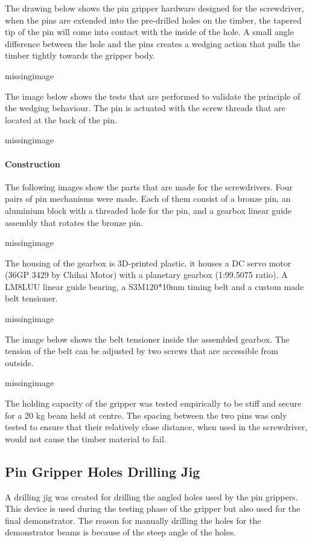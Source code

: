 The drawing below shows the pin gripper hardware designed for the screwdriver, when the pins are extended into the pre-drilled holes on the timber, the tapered tip of the pin will come into contact with the inside of the hole. A small angle difference between the hole and the pins creates a wedging action that pulls the timber tightly towards the gripper body.  

missingimage

The image below shows the tests that are performed to validate the principle of the wedging behaviour. The pin is actuated with the screw threads that are located at the back of the pin. 

missingimage

\paragraph{Construction}
The following images show the parts that are made for the screwdrivers. Four pairs of pin mechanisms were made. Each of them consist of a bronze pin, an aluminium block with a threaded hole for the pin, and a gearbox linear guide assembly that rotates the bronze pin.

missingimage

The housing of the gearbox is 3D-printed plastic, it houses a DC servo motor (36GP 3429 by Chihai Motor) with a planetary gearbox (1:99.5075 ratio). A LM8LUU linear guide bearing, a S3M120*10mm timing belt and a custom made belt tensioner.

missingimage

The image below shows the belt tensioner inside the assembled gearbox. The tension of the belt can be adjusted by two screws that are accessible from outside.

missingimage

The holding capacity of the gripper was tested empirically to be stiff and secure for a 20 kg beam held at centre. The spacing between the two pins was only tested to ensure that their relatively close distance, when used in the screwdriver, would not cause the timber material to fail. 

\subsection{Pin Gripper Holes Drilling Jig}
\label{subsection:exploration_4_pin_gripper_holes_drilling_jig}

A drilling jig was created for drilling the angled holes used by the pin grippers. This device is used during the testing phase of the gripper but also used for the final demonstrator. The reason for manually drilling the holes for the demonstrator beams is because of the steep angle of the holes. 

